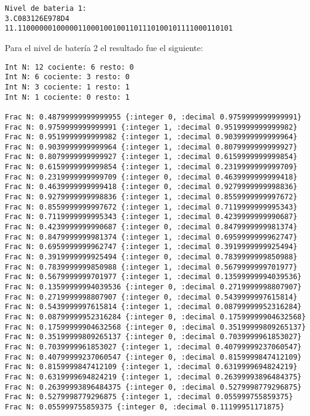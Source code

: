 \documentclass[stu, 12pt, letterpaper, donotrepeattitle, floatsintext, natbib]{apa7}
\begin{document}
\begin{verbatim}
Nivel de bateria 1: 
3.C083126E978D4
11.11000000100000110001001001101110100101111000110101

\end{verbatim}

Para el nivel de batería 2 el resultado fue el siguiente:

\begin{verbatim}
Int N: 12 cociente: 6 resto: 0
Int N: 6 cociente: 3 resto: 0
Int N: 3 cociente: 1 resto: 1
Int N: 1 cociente: 0 resto: 1

Frac N: 0.48799999999999955 {:integer 0, :decimal 0.9759999999999991}
Frac N: 0.9759999999999991 {:integer 1, :decimal 0.9519999999999982}
Frac N: 0.9519999999999982 {:integer 1, :decimal 0.9039999999999964}
Frac N: 0.9039999999999964 {:integer 1, :decimal 0.8079999999999927}
Frac N: 0.8079999999999927 {:integer 1, :decimal 0.6159999999999854}
Frac N: 0.6159999999999854 {:integer 1, :decimal 0.2319999999999709}
Frac N: 0.2319999999999709 {:integer 0, :decimal 0.4639999999999418}
Frac N: 0.4639999999999418 {:integer 0, :decimal 0.9279999999998836}
Frac N: 0.9279999999998836 {:integer 1, :decimal 0.8559999999997672}
Frac N: 0.8559999999997672 {:integer 1, :decimal 0.7119999999995343}
Frac N: 0.7119999999995343 {:integer 1, :decimal 0.4239999999990687}
Frac N: 0.4239999999990687 {:integer 0, :decimal 0.8479999999981374}
Frac N: 0.8479999999981374 {:integer 1, :decimal 0.6959999999962747}
Frac N: 0.6959999999962747 {:integer 1, :decimal 0.3919999999925494}
Frac N: 0.3919999999925494 {:integer 0, :decimal 0.7839999999850988}
Frac N: 0.7839999999850988 {:integer 1, :decimal 0.5679999999701977}
Frac N: 0.5679999999701977 {:integer 1, :decimal 0.13599999994039536}
Frac N: 0.13599999994039536 {:integer 0, :decimal 0.2719999998807907}
Frac N: 0.2719999998807907 {:integer 0, :decimal 0.5439999997615814}
Frac N: 0.5439999997615814 {:integer 1, :decimal 0.08799999952316284}
Frac N: 0.08799999952316284 {:integer 0, :decimal 0.17599999904632568}
Frac N: 0.17599999904632568 {:integer 0, :decimal 0.35199999809265137}
Frac N: 0.35199999809265137 {:integer 0, :decimal 0.7039999961853027}
Frac N: 0.7039999961853027 {:integer 1, :decimal 0.40799999237060547}
Frac N: 0.40799999237060547 {:integer 0, :decimal 0.8159999847412109}
Frac N: 0.8159999847412109 {:integer 1, :decimal 0.6319999694824219}
Frac N: 0.6319999694824219 {:integer 1, :decimal 0.26399993896484375}
Frac N: 0.26399993896484375 {:integer 0, :decimal 0.5279998779296875}
Frac N: 0.5279998779296875 {:integer 1, :decimal 0.055999755859375}
Frac N: 0.055999755859375 {:integer 0, :decimal 0.11199951171875}

\end{verbatim}
\end{document}

